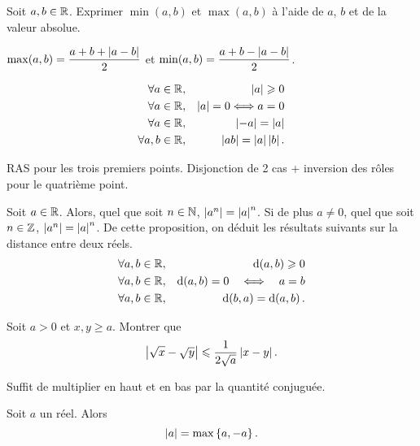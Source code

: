 \documentclass{magnoliaold}
\begin{document}
\begin{exoUnique}
\exo Soit $a,b\in\mathbb{R}$. Exprimer $\min(a,b)$ et $\max(a,b)$
  à l'aide de $a$, $b$ et de la valeur absolue.
\end{exoUnique}
\begin{sol}
$\max(a,b)=\dfrac{a+b+\left|a-b\right|}{2}$ et $\min(a,b)=\dfrac{a+b-\left|a-b\right|}{2}$.
\end{sol}

\begin{proposition}
\begin{eqnarray*}
\forall a\in\mathbb{R}, & & \left|a\right|\geqslant 0\\
\forall a\in\mathbb{R}, & & \left|a\right|=0 \Longleftrightarrow a=0\\
\forall a\in\mathbb{R}, & & \left|-a\right|=\left|a\right|\\
\forall a,b\in\mathbb{R}, & & \left|ab\right|=\left|a\right|\left|b\right|.
\end{eqnarray*}
\end{proposition}
\begin{preuve}
RAS pour les trois premiers points. Disjonction de 2 cas + inversion des rôles pour le quatrième point.
\end{preuve}

\begin{remarques}
\remarque Soit $a\in\mathbb{R}$. Alors, quel que soit $n\in\mathbb{N}$, $\left|a^n\right|=\left|a\right|^n$. Si de
  plus $a\neq 0$, quel que soit $n\in\mathbb{Z}$, $\left|a^n\right|=\left|a\right|^n$. 
\remarque De cette proposition, on déduit les résultats suivants sur la distance
  entre deux réels.
  \begin{eqnarray*}
  \forall a,b\in\mathbb{R}, & & {\rm d}\!\left(a,b\right)\geqslant 0\\
  \forall a,b\in\mathbb{R}, & & {\rm d}\!\left(a,b\right)=0 \quad\Longleftrightarrow\quad a=b\\
  \forall a,b\in\mathbb{R}, & & {\rm d}\!\left(b,a\right)={\rm d}\!\left(a,b\right).
  \end{eqnarray*}
\end{remarques}

\begin{exoUnique}
\exo Soit $a>0$ et $x,y\geq a$. Montrer que
  \[\left|\sqrt{x}-\sqrt{y}\right|\leqslant\frac{1}{2\sqrt{a}}\left|x-y\right|.\]
	\begin{sol}
	Suffit de multiplier en haut et en bas par la quantité conjuguée.
	\end{sol}
\end{exoUnique}



\begin{proposition}
Soit $a$ un réel. Alors
\[\left|a\right|=\max\left\{a,-a\right\}.\]
\end{proposition}
\end{document}
